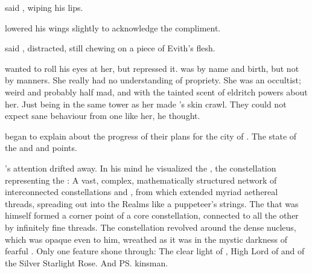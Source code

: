 \begin{comment}
  \subsection{Cabal matters}
\end{comment}
\new
{} said \Ganethed, wiping his lips. 

\Teshrial lowered his wings slightly to acknowledge the compliment.

 said \Urizeth, distracted, still chewing on a piece of Evith's flesh. 

\Teshrial wanted to roll his eyes at her, but repressed it. 
\Urizeth was \CiriathSepher by name and birth, but not by manners. 
She really had no understanding of propriety. 
She was an occultist; weird and probably half mad, and with the tainted scent of eldritch powers about her. 
Just being in the same tower as her made \Teshrial's skin crawl. 
They could not expect sane behaviour from one like her, he thought. 

\Urizeth began to explain about the progress of their plans for the city of \Malcur. 
The state of the \vertices and \matrices and \nexus points. 


\Teshrial's attention drifted away.
In his mind he visualized the , the constellation representing the \KiriathSepher{} \matrix: 
A vast, complex, mathematically structured network of interconnected constellations and \vertices{}, from which extended myriad aethereal threads, spreading out into the Realms like a puppeteer's strings. 
The \vertex{} that was \Teshrial{} himself formed a corner point of a core constellation, connected to all the other \vertices{} by infinitely fine threads. 
The constellation revolved around the dense \matrix{} nucleus, which was opaque even to him, wreathed as it was in the mystic darkness of fearful \Erebos. 
Only one feature shone through: 
The clear light of , High Lord of \CiriathSepher{} and \apex{} of the {Silver Starlight Rose}. 
And \ps{\Teshrial} kinsman. 

